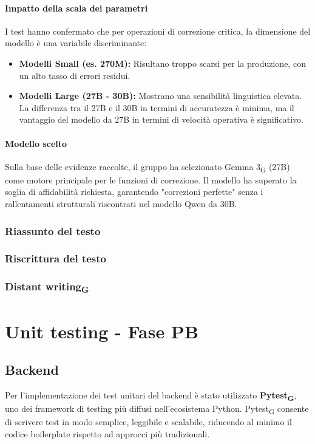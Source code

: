 \documentclass[11pt,a4paper]{article}
\newcommand{\gls}[1]{#1\textsubscript{G}}
\begin{document}
\paragraph{Impatto della scala dei parametri}
I test hanno confermato che per operazioni di correzione critica, la dimensione del modello è una variabile discriminante:
\begin{itemize}
    \item \textbf{Modelli Small (es. 270M):} Risultano troppo scarsi per la produzione, con un alto tasso di errori residui.
    \item \textbf{Modelli Large (27B - 30B):} Mostrano una sensibilità linguistica elevata. La differenza tra il 27B e il 30B in termini di accuratezza è minima, ma il vantaggio del modello da 27B in termini di velocità operativa è significativo.
\end{itemize}
\paragraph{Modello scelto}
Sulla base delle evidenze raccolte, il gruppo ha selezionato \gls{Gemma 3} (27B) come motore principale per le funzioni di correzione. Il modello ha superato la soglia di affidabilità richiesta, garantendo "correzioni perfette" senza i rallentamenti strutturali riscontrati nel modello Qwen da 30B.

\subsubsection{Riassunto del testo}
\subsubsection{Riscrittura del testo}
\subsubsection{\gls{Distant writing}}

\newpage

\section{Unit testing - Fase PB}

\subsection{Backend}
Per l’implementazione dei test unitari del backend è stato utilizzato \textbf{\gls{Pytest}}, uno dei framework di testing più diffusi nell’ecosistema Python. \gls{Pytest} consente di scrivere test in modo semplice, leggibile e scalabile, riducendo al minimo il codice boilerplate rispetto ad approcci più tradizionali.
\end{document}
